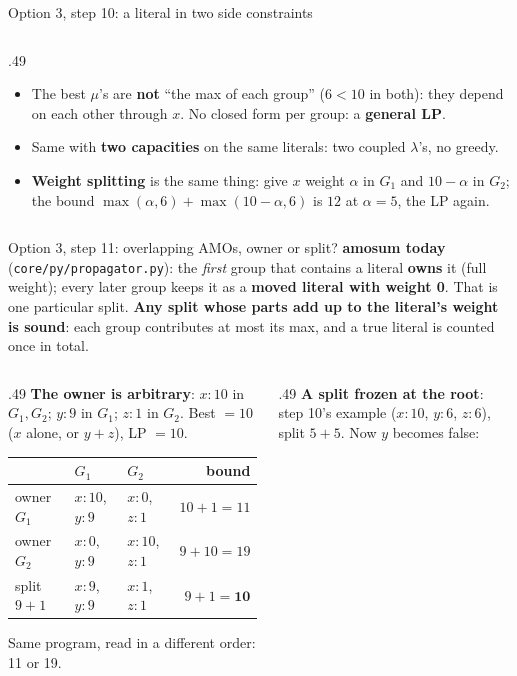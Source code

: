 \documentclass[aspectratio=169,11pt]{beamer}
\newcommand{\file}[1]{{\small\texttt{\color{acc}#1}}}
\begin{document}
\begin{frame}{Option 3, step 10: a literal in two side constraints}
\begin{columns}[T]
\begin{column}{.49\textwidth}
\begin{itemize}
\item The best $\mu$'s are \textbf{not} ``the max of each group'' ($6 < 10$ in both): they depend on each other through
  $x$. No closed form per group: a \textbf{general LP}.
\item Same with \textbf{two capacities} on the same literals: two coupled $\lambda$'s, no greedy.
\item \textbf{Weight splitting} is the same thing: give $x$ weight $\alpha$ in $G_1$ and $10-\alpha$ in $G_2$; the bound
  $\max(\alpha,6) + \max(10-\alpha,6)$ is $12$ at $\alpha = 5$, the LP again.
\end{itemize}
\end{column}
\end{columns}
\end{frame}

\begin{frame}{Option 3, step 11: overlapping AMOs, owner or split?}
\scriptsize
\textbf{amosum today} (\file{core/py/propagator.py}): the \emph{first} group that contains a literal \textbf{owns} it (full
weight); every later group keeps it as a \textbf{moved literal with weight 0}. That is one particular split. \textbf{Any split
whose parts add up to the literal's weight is sound}: each group contributes at most its max, and a true literal is
counted once in total.
\begin{columns}[T]
\begin{column}{.49\textwidth}
\textcolor{acc}{\textbf{The owner is arbitrary}}: $x{:}10$ in $G_1, G_2$; $y{:}9$ in $G_1$; $z{:}1$ in $G_2$.
Best $= 10$ ($x$ alone, or $y + z$), LP $= 10$.
\begin{center}
\begin{tabular}{lllr}\toprule
 & $G_1$ & $G_2$ & bound\\\midrule
owner $G_1$ & $x{:}10$, $y{:}9$ & $x{:}0$, $z{:}1$ & $10 + 1 = 11$\\
owner $G_2$ & $x{:}0$, $y{:}9$ & $x{:}10$, $z{:}1$ & $9 + 10 = 19$\\
split $9 + 1$ & $x{:}9$, $y{:}9$ & $x{:}1$, $z{:}1$ & $9 + 1 = \mathbf{10}$\\\bottomrule
\end{tabular}
\end{center}
Same program, read in a different order: 11 or 19.
\end{column}
\begin{column}{.49\textwidth}
\textcolor{acc}{\textbf{A split frozen at the root}}: step 10's example ($x{:}10$, $y{:}6$, $z{:}6$), split $5 + 5$.
Now $y$ becomes false:

\end{column}
\end{columns}
\end{frame}
\end{document}
